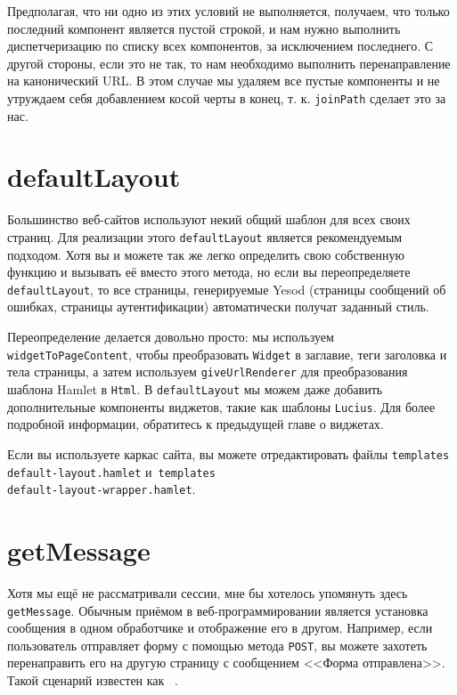 Предполагая, что ни одно из этих условий не выполняется, получаем, что только
последний компонент является пустой строкой, и нам нужно выполнить
диспетчеризацию по списку всех компонентов, за исключением последнего. С другой
стороны, если это не так, то нам необходимо выполнить перенаправление на
канонический URL. В этом случае мы удаляем все пустые компоненты и не утруждаем
себя добавлением косой черты в конец, т. к. \lstinline!joinPath! сделает это за
нас.

\section {defaultLayout}

Большинство веб-сайтов используют некий общий шаблон для всех своих страниц.
Для реализации этого \lstinline!defaultLayout! является рекомендуемым подходом.
Хотя вы и можете так же легко определить свою собственную функцию и вызывать её
вместо этого метода, но если вы переопределяете \lstinline!defaultLayout!, то
все страницы, генерируемые Yesod (страницы сообщений об ошибках, страницы
аутентификации) автоматически получат заданный стиль.

Переопределение делается довольно просто: мы используем
\lstinline!widgetToPageContent!, чтобы преобразовать \lstinline!Widget! в
заглавие, теги заголовка и тела страницы, а затем используем
\lstinline!giveUrlRenderer! для преобразования шаблона Hamlet в
\lstinline!Html!. В \lstinline!defaultLayout! мы можем даже добавить
дополнительные компоненты виджетов, такие как шаблоны \lstinline!Lucius!.
Для более подробной информации, обратитесь к предыдущей главе о виджетах.

Если вы используете каркас сайта, вы можете отредактировать файлы
\texttt{templates\\default-layout.hamlet}
и~\texttt{templates\\default-layout-wrapper.hamlet}.

\section {getMessage}

Хотя мы ещё не рассматривали сессии, мне бы хотелось упомянуть здесь
\lstinline!getMessage!. Обычным приёмом в веб-программировании является
установка сообщения в одном обработчике и отображение его в другом. Например,
если пользователь отправляет форму с помощью метода \lstinline!POST!, вы можете
захотеть перенаправить его на другую страницу с сообщением <<Форма
отправлена>>. Такой сценарий известен как~%
.

